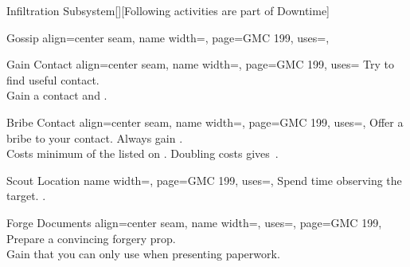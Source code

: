 \begin{PageFront}
\begin{Tables}{\frontTableHeight}
\begin{Table}{Infiltration Subsystem}[\;\dash\;][Following activities are part of Downtime]
\begin{entry}{Gossip}{%
                align=center seam,
                name width=\activityLength,%
                page=GMC 199,
                uses={\Diplomacy[tags=S]},
            }
            \end{entry}
            \begin{entry}{Gain Contact}{%
                align=center seam,
                name width=\activityLength,%
                page=GMC 199,
                uses={}
            }
                Try to find useful contact.\\
                Gain a contact and  .\hfill
            \end{entry}
            \begin{entry}{Bribe Contact}{%
                align=center seam,
                name width=\activityLength,%
                page=GMC 199,
                uses=,
            }
                Offer a bribe to your contact. \hfill Always gain  .\\
                Costs minimum  of the  listed on . \hfill
                Doubling costs gives \,\Cirm.\\
            \end{entry}
            \begin{entry}{Scout Location}{%
                name width=\activityLength,%
                page=GMC 199,
                uses=,
            }
                Spend time observing the target.\hfill
                 \hfill
                .
            \end{entry}
            \begin{entry}{Forge Documents}{%
                align=center seam,
                name width=\activityLength,%
                uses={\Society[tags=S]},
                page=GMC 199,
            }
                Prepare a convincing forgery prop. \\
                Gain   that you can only use when presenting paperwork.\hfill

\end{entry}
\end{Table}
\end{Tables}
\end{PageFront}
